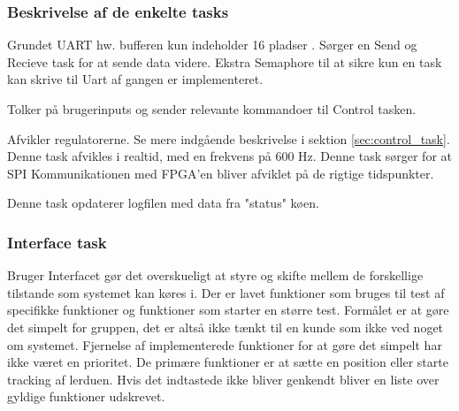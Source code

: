 \subsubsection{Beskrivelse af de enkelte tasks}
\begin{description}
\itemsep-3pt
	\item[UART] Grundet UART hw. bufferen kun indeholder 16 pladser \citep[Side. 430]{lm3s6965}. Sørger en Send og Recieve task for at sende data videre. Ekstra Semaphore til at sikre kun en task kan skrive til Uart af gangen er implementeret.
	\item[Interface] Tolker på brugerinputs og sender relevante kommandoer til Control tasken.
	\item[Control] Afvikler regulatorerne. Se mere indgående beskrivelse i sektion \ref{sec:control_task}. Denne task afvikles i realtid, med en frekvens på 600 Hz. 
	Denne task sørger for at SPI Kommunikationen med FPGA'en bliver afviklet på de rigtige tidspunkter.
	\item[Logger] Denne task opdaterer logfilen med data fra "status" køen.
\end{description}

\subsubsection{Interface task}
\label{sec:interface}
Bruger Interfacet gør det overskueligt at styre og skifte mellem de forskellige tilstande som systemet kan køres i.
Der er lavet funktioner som bruges til test af specifikke funktioner og funktioner som starter en større test.
Formålet er at gøre det simpelt for gruppen, det er altså ikke tænkt til en kunde som ikke ved noget om systemet.
Fjernelse af implementerede funktioner for at gøre det simpelt har ikke været en prioritet. 
De primære funktioner er at sætte en position eller starte tracking af lerduen.
Hvis det indtastede ikke bliver genkendt bliver en liste over gyldige funktioner udskrevet.

